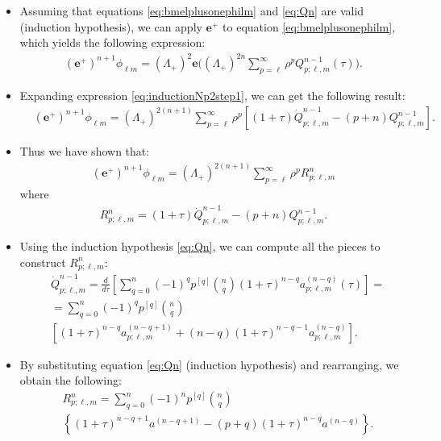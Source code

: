 \documentclass{beamer}
\theoremstyle{remark}
\theoremstyle{plain}
\theoremstyle{plain}
\begin{document}
\begin{frame}
  \begin{itemize}
    \item Assuming that equations \eqref{eq:bmelplusonephilm} and \eqref{eq:Qn} are valid (induction hypothesis), we can apply $\boldsymbol{e}^{+}$ to equation \eqref{eq:bmelplusonephilm}, which yields the following expression:
    \begin{align}\label{eq:inductionNp2step1}
      (\boldsymbol{e}^+)^{n+1}\phi_{\ell m} = (\Lambda_{+})^{2}\boldsymbol{e}\Big((\Lambda_{+})^{2n}\sum_{p=\ell}^{\infty}\rho^p Q^{n-1}_{p;\ell,m}(\tau)\Big).
    \end{align}
    \item Expanding expression \eqref{eq:inductionNp2step1}, we can get the following result:
    \begin{align}\label{eq:inductionNp2step2}
      & (\boldsymbol{e}^+)^{n+1}\phi_{\ell m}=(\Lambda_{+})^{2(n+1)} \sum_{p=\ell}^{\infty} \rho^{p} \left[(1+\tau)\dot{Q}^{n-1}_{p;\ell,m}-(p+n)Q^{n-1}_{p;\ell,m}\right].
    \end{align}
    \item Thus we have shown that:
    \begin{align}\label{eq:inductionNp2step3}
      (\boldsymbol{e}^+)^{n+1}\phi_{\ell m} = (\Lambda_{+})^{2(n+1)} \sum_{p=\ell}^{\infty} \rho^{p}  R^{n}_{p;\ell,m}
    \end{align}
    where 
    \begin{align}\label{eq:QNrecursive}
      R^{n}_{p;\ell,m}=(1+\tau)\dot{Q}^{n-1}_{p;\ell,m}-(p+n)Q^{n-1}_{p;\ell,m}.
    \end{align}
  \end{itemize}
\end{frame}

\begin{frame}
  \begin{itemize}
    \item Using the induction hypothesis \eqref{eq:Qn}, we can compute all the pieces to construct $R^{n}_{p;\ell,m}$:
    \begin{align}\label{eq:Qndot}
      & \dot{Q}_{p;\ell,m}^{n-1} = \frac{d}{d \tau}\left[\sum_{q=0}^{n}(-1)^{q} p^{[q]}{n \choose q}(1+\tau)^{n-q}a_{p;\ell,m}^{(n-q)}(\tau)\right] = \nonumber \\
      & = \sum_{q=0}^{n}(-1)^{q} p^{[q]}{n \choose q} \nonumber \\
      & \left[(1+\tau)^{n-q} a_{p;\ell,m}^{(n-q+1)} + (n-q)(1+\tau)^{n-q-1} a_{p;\ell,m}^{(n-q)}\right].
    \end{align}
    \item By substituting equation \eqref{eq:Qn} (induction hypothesis) and rearranging, we obtain the following:
    \begin{align}\label{eq:Rn1}
      & R^{n}_{p;\ell,m} =\sum_{q=0}^{n}(-1)^{n}p^{[q]}{n \choose q} \nonumber\\ 
      & \left\{(1+\tau)^{n-q+1} a^{(n-q+1)}-(p+q)(1+\tau)^{n-q} a^{(n-q)}\right\}.
    \end{align}
  \end{itemize}
\end{frame}
\end{document}
